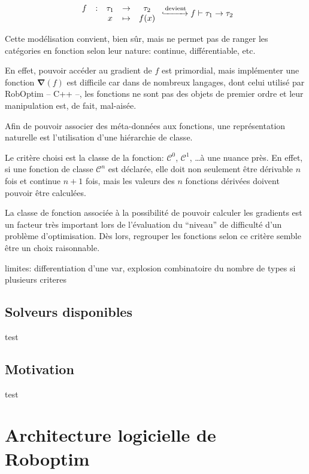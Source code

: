 \begin{equation}
  \begin{array}{ccccc}
    f & : & \tau_1 & \rightarrow & \tau_2\\
    ~ & ~ & x      & \mapsto     & f(x)
  \end{array}
  \xhookrightarrow{\text{devient}}
  f \vdash \tau_1 \rightarrow \tau_2
\end{equation}

Cette modélisation convient, bien sûr, mais ne permet pas de ranger
les catégories en fonction selon leur nature: continue,
différentiable, etc.

En effet, pouvoir accéder au gradient de $f$ est primordial, mais
implémenter une fonction $\mathbf{\nabla}(f)$ est difficile car dans
de nombreux langages, dont celui utilisé par RobOptim -- C++ --, les
fonctions ne sont pas des objets de premier ordre et leur manipulation
est, de fait, mal-aisée.

Afin de pouvoir associer des méta-données aux fonctions, une
représentation naturelle est l'utilisation d'une hiérarchie de classe.

Le critère choisi est la classe de la fonction: $\mathcal{C}^0$,
$\mathcal{C}^1$, \ldots à une nuance près. En effet, si une fonction
de classe $\mathcal{C}^n$ est déclarée, elle doit non seulement être
dérivable $n$ fois et continue $n+1$ fois, mais les valeurs des $n$
fonctions dérivées doivent pouvoir être calculées.

La classe de fonction associée à la possibilité de pouvoir calculer
les gradients est un facteur très important lors de l'évaluation du
``niveau'' de difficulté d'un problème d'optimisation. Dès lors,
regrouper les fonctions selon ce critère semble être un choix
raisonnable.


limites: differentiation d'une var, explosion combinatoire du nombre
de types si plusieurs criteres



\subsection{Solveurs disponibles}

test

\subsection{Motivation}

test


\section{Architecture logicielle de Roboptim}

